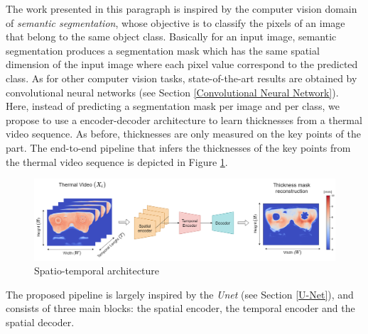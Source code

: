 The work presented in this paragraph is inspired by the computer vision domain of \textit{semantic segmentation}, whose objective is to classify  the pixels of an image that belong to the same object class. Basically for an input image, semantic segmentation produces a segmentation mask which has the same spatial dimension of the input image where each pixel value correspond to the predicted class. As for other computer vision tasks, state-of-the-art results are obtained by convolutional neural networks (see Section \ref{Convolutional Neural Network}).
Here, instead of predicting a segmentation mask per image and per class, we propose to use a encoder-decoder architecture to learn thicknesses from a thermal video sequence. As before, thicknesses are only measured on the key points of the part. The end-to-end pipeline that infers the thicknesses of the key points from the thermal video sequence is depicted in Figure \ref{fig:spatio_temporal_architecture}.
%
\begin{figure}
\centering
\includegraphics[scale=0.35]{images/chapter_4/Spatio-Temporal.png}
\caption{Spatio-temporal architecture}
\label{fig:spatio_temporal_architecture}
\end{figure}
%
The proposed pipeline is largely inspired by the \textit{Unet} (see Section \ref{U-Net}), and consists of three main blocks: the spatial encoder, the temporal encoder and the spatial decoder. 

